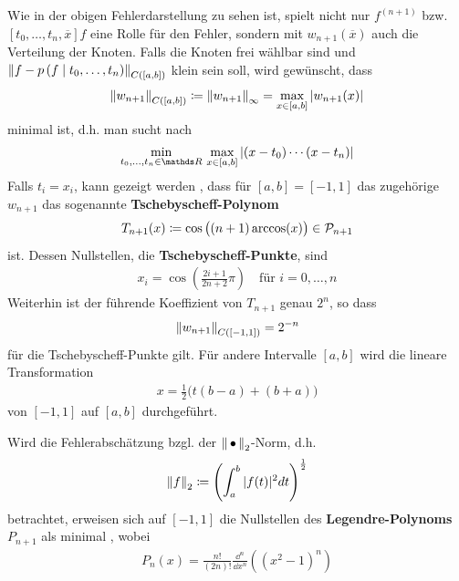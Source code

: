 Wie in der obigen Fehlerdarstellung zu sehen ist,
spielt nicht nur $f^{(n+1)}$ bzw.
$[t_0,\dotsc,t_n, \overline{x}]f$ eine Rolle für den Fehler,
sondern mit $w_{n+1}(\overline{x})$ auch die Verteilung der Knoten.
Falls die Knoten frei wählbar sind und
$\nn[f-\ipol{p}{f}{t_0,\dotsc,t_n}]_{C([a,b])}$
klein sein soll, wird gewünscht, dass
\begin{gather*}\index{Norm}
  \nn[w_{n+1}]_{C([a,b])}\coloneqq \nn[w_{n+1}]_\infty
  = \max_{x\in[a,b]}|w_{n+1}(x)|
\end{gather*}
minimal ist, d.h. man sucht nach
\begin{gather*}
  \min_{t_0,\dotsc,t_n\in\R}\,\max_{x\in[a,b]}
  |(x-t_0)\dotsm(x-t_n)|
\end{gather*}
Falls $t_i=x_i$, kann gezeigt werden 
\cite[z.B.][]{deuflhardhohmann,freundhoppe},
dass für $[a,b]=[-1,1]$ das zugehörige $w_{n+1}$
das sogenannte
\textbf{Tschebyscheff-Polynom}
\begin{gather}
  T_{n+1}(x)\coloneqq \cos\big((n+1)\arccos(x)\big)\in\p_{n+1}
  \label{VI.1.24}
\end{gather}
ist. Dessen Nullstellen, die 
\textbf{Tschebyscheff-Punkte}, sind
\begin{gather}
  x_i= \cos\left(\frac{2i+1}{2n+2}\pi\right)\quad \text{für } i=0,\dotsc,n
  \label{VI.1.25}
\end{gather}
Weiterhin ist der führende Koeffizient von 
$T_{n+1}$ genau $2^n$, so dass 
\begin{gather}
  \nn[w_{n+1}]_{C([-1,1])}=2^{-n}
  \label{VI.1.26}
\end{gather}
für die Tschebyscheff-Punkte gilt.
Für andere Intervalle $[a,b]$ wird die lineare Transformation
\begin{gather*}
  x=\frac{1}{2}\big(t(b-a)+(b+a)\big)
\end{gather*}
von $[-1,1]$ auf $[a,b]$ durchgeführt.

Wird die Fehlerabschätzung bzgl. der 
$\nn_2$-Norm,
d.h. 
\begin{gather*}
  \nn[f]_2\coloneqq \left(\int_{a}^{b}|f(t)|^2dt \right)^\frac{1}{2}
\end{gather*}
betrachtet, erweisen sich auf $[-1,1]$ die Nullstellen
des \textbf{Legendre-Polynoms} $P_{n+1}$
als minimal \cite{haemmerlinhoffmann}, wobei
\begin{gather*}
  P_n(x) = \frac{n!}{(2n)!}\frac{\dd^n}{\dd x^n}\left((x^2-1)^n\right)
\end{gather*}


